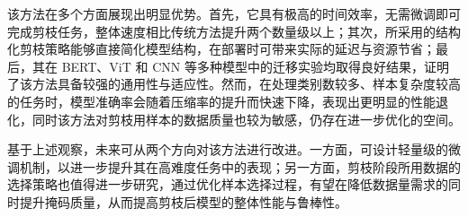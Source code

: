 \documentclass[UTF8,openany]{ctexbook}
\begin{document}
该方法在多个方面展现出明显优势。首先，它具有极高的时间效率，无需微调即可完成剪枝任务，整体速度相比传统方法提升两个数量级以上；其次，所采用的结构化剪枝策略能够直接简化模型结构，在部署时可带来实际的延迟与资源节省；最后，其在 BERT、ViT 和 CNN 等多种模型中的迁移实验均取得良好结果，证明了该方法具备较强的通用性与适应性。然而，在处理类别数较多、样本复杂度较高的任务时，模型准确率会随着压缩率的提升而快速下降，表现出更明显的性能退化，同时该方法对剪枝用样本的数据质量也较为敏感，仍存在进一步优化的空间。

基于上述观察，未来可从两个方向对该方法进行改进。一方面，可设计轻量级的微调机制，以进一步提升其在高难度任务中的表现；另一方面，剪枝阶段所用数据的选择策略也值得进一步研究，通过优化样本选择过程，有望在降低数据量需求的同时提升掩码质量，从而提高剪枝后模型的整体性能与鲁棒性。
\newpage


\end{document}
